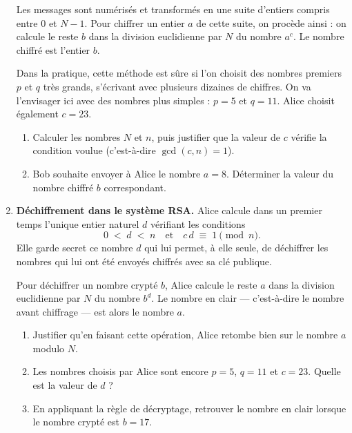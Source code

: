 \documentclass[a4paper,12pt]{article}
\begin{document}
\begin{multicols}{2}
\begin{exercice}[title=Exercice 28 $\star\star\star$ { [Modéliser, Calculer] }]{}{}
\begin{enumerate}
      Les messages sont numérisés et transformés en une suite d'entiers compris entre \(0\) et \(N-1\). Pour chiffrer un entier \(a\) de cette suite, on procède ainsi : on calcule le reste \(b\) dans la division euclidienne par \(N\) du nombre \(a^c\). Le nombre chiffré est l'entier \(b\).

      \medskip
      \noindent
      Dans la pratique, cette méthode est sûre si l'on choisit des nombres premiers \(p\) et \(q\) très grands, s'écrivant avec plusieurs dizaines de chiffres. On va l'envisager ici avec des nombres plus simples : \(p = 5\) et \(q = 11\). Alice choisit également \(c = 23\).

      \begin{enumerate}
        \item Calculer les nombres \(N\) et \(n\), puis justifier que la valeur de \(c\) vérifie la condition voulue (c'est-à-dire \(\gcd(c, n) = 1\)).
        \item Bob souhaite envoyer à Alice le nombre \(a = 8\). Déterminer la valeur du nombre chiffré \(b\) correspondant.
      \end{enumerate}
      \newcolumn

    \item \textbf{Déchiffrement dans le système RSA.}
      Alice calcule dans un premier temps l'unique entier naturel \(d\) vérifiant les conditions
      \[
        0 \;<\; d \;<\; n
        \quad\text{et}\quad
        c\,d \;\equiv\; 1 \pmod{n}.
      \]
      Elle garde secret ce nombre \(d\) qui lui permet, à elle seule, de déchiffrer les nombres qui lui ont été envoyés chiffrés avec sa clé publique.

      Pour déchiffrer un nombre crypté \(b\), Alice calcule le reste \(a\) dans la division euclidienne par \(N\) du nombre \(b^d\). Le nombre en clair — c'est-à-dire le nombre avant chiffrage — est alors le nombre \(a\).

      \begin{enumerate}
        \item Justifier qu'en faisant cette opération, Alice retombe bien sur le nombre \(a\) modulo \(N\).
        \item Les nombres choisis par Alice sont encore \(p = 5\), \(q = 11\) et \(c = 23\).
          Quelle est la valeur de \(d\) ?
        \item En appliquant la règle de décryptage, retrouver le nombre en clair lorsque le nombre crypté est \(b = 17\).
      \end{enumerate}


\end{enumerate}
\end{exercice}
\end{multicols}
\end{document}
